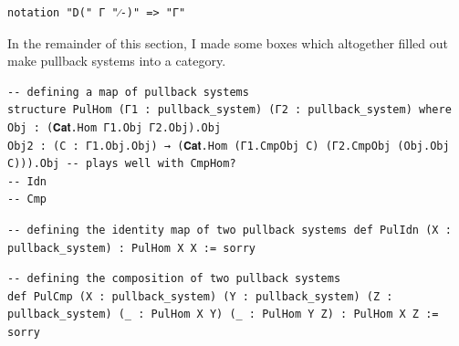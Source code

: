 \documentclass{book}
\theoremstyle{definition}
\newcounter{lcounter}
\begin{document}
 \begin{center} \begin{tcolorbox}[width=5in,colback={white},title={\begin{center}\texttt{Lean \thelcounter} \addtocounter{lcounter}{1} \end{center}},colbacktitle=Blue,coltitle=black] \begin{verbatim}
notation "D(" Γ "⁄-)" => "Γ"
\end{verbatim} \end{tcolorbox} \end{center}
In the remainder of this section, I made some boxes which altogether filled out make pullback systems into a category.\\
\begin{center} \begin{tcolorbox}[width=5in,colback={white},title={\begin{center}\texttt{Lean \thelcounter} \addtocounter{lcounter}{1} \end{center}},colbacktitle=Blue,coltitle=black] \begin{verbatim}
-- defining a map of pullback systems
structure PulHom (Γ1 : pullback_system) (Γ2 : pullback_system) where
Obj : (𝐂𝐚𝐭.Hom Γ1.Obj Γ2.Obj).Obj
Obj2 : (C : Γ1.Obj.Obj) → (𝐂𝐚𝐭.Hom (Γ1.CmpObj C) (Γ2.CmpObj (Obj.Obj C))).Obj -- plays well with CmpHom?
-- Idn
-- Cmp
\end{verbatim} \end{tcolorbox} \end{center}
\begin{center} \begin{tcolorbox}[width=5in,colback={white},title={\begin{center}\texttt{Lean \thelcounter} \addtocounter{lcounter}{1} \end{center}},colbacktitle=Blue,coltitle=black] \begin{verbatim}
-- defining the identity map of two pullback systems def PulIdn (X : pullback_system) : PulHom X X := sorry
\end{verbatim} \end{tcolorbox}

 \end{center}
\begin{center} \begin{tcolorbox}[width=5in,colback={white},title={\begin{center}\texttt{Lean \thelcounter} \addtocounter{lcounter}{1} \end{center}},colbacktitle=Blue,coltitle=black] \begin{verbatim}
-- defining the composition of two pullback systems
def PulCmp (X : pullback_system) (Y : pullback_system) (Z : pullback_system) (_ : PulHom X Y) (_ : PulHom Y Z) : PulHom X Z := sorry
\end{verbatim} \end{tcolorbox} \end{center}
\end{document}
